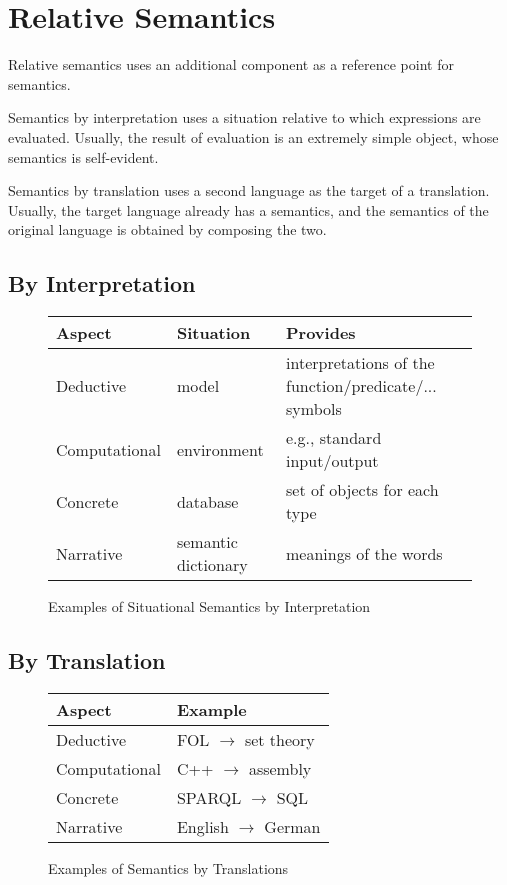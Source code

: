 \section{Relative Semantics}

Relative semantics uses an additional component as a reference point for semantics.

Semantics by interpretation uses a situation relative to which expressions are evaluated.
Usually, the result of evaluation is an extremely simple object, whose semantics is self-evident.

Semantics by translation uses a second language as the target of a translation.
Usually, the target language already has a semantics, and the semantics of the original language is obtained by composing the two.

\subsection{By Interpretation}

\begin{figure}[hbt]
\begin{tabular}{l|ll}
Aspect & Situation & Provides\\\hline
Deductive & model & interpretations of the function/predicate/... symbols\\
Computational & environment & e.g., standard input/output \\
Concrete & database & set of objects for each type \\
Narrative & semantic dictionary & meanings of the words \\
\end{tabular}
\caption{Examples of Situational Semantics by Interpretation}\label{fig:sit}
\end{figure}

\subsection{By Translation}

\begin{figure}[hbt]
\begin{tabular}{l|l}
Aspect & Example\\\hline
Deductive & FOL $\to$ set theory\\
Computational & C++ $\to$ assembly \\
Concrete & SPARQL $\to$ SQL \\
Narrative & English $\to$ German \\
\end{tabular}
\caption{Examples of Semantics by Translations}\label{fig:trans}
\end{figure}

